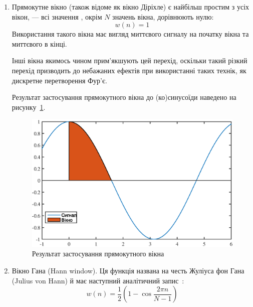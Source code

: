         \begin{enumerate}
            \item Прямокутне вікно (також відоме як вікно Діріхле) є найбільш простим з усіх вікон, --- всі значення ,
                окрім $N$ значень вікна, дорівнюють нулю:
                \begin{equation*}
                    w( n ) = 1
                \end{equation*}
                Використання такого вікна має вигляд миттєвого  сигналу на початку вікна та
                миттєвого  в кінці.

                Інші вікна якимось чином прим’якшують цей перехід, оскільки такий різкий перехід призводить до
                небажаних ефектів при використанні таких технік, як дискретне перетворення Фур’є.

                Результат застосування прямокутного вікна до (ко)синусоїди наведено на рисунку~\ref{fig:rekt-appl}.

                \begin{figure}[h]
                    \centering
                    \includegraphics[width=\textwidth]{rect-applicated.eps}
                    \caption{Результат застосування прямокутного вікна}
                    \label{fig:rekt-appl}
                \end{figure}
            \item Вікно Гана (Hann window).
                Ця функція названа на честь Жуліуса фон Гана (Julius von Hann) й має наступний аналітичний
                запис~\cite{book11}:
                \begin{equation}
                    w( n ) = \frac12 \left( 1 - \cos{ \frac{ 2 \pi n}{N - 1}} \right)
                \end{equation}


\end{enumerate}
